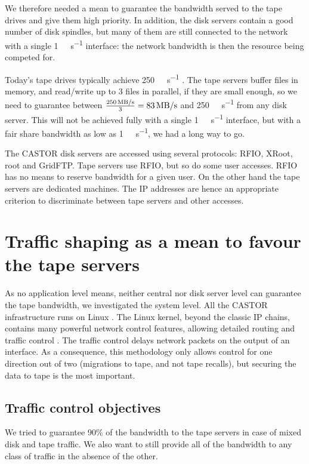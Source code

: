 \documentclass[a4paper]{jpconf}
\begin{document}
We therefore needed a mean to guarantee the bandwidth served to the tape drives and give them high priority. In addition, the disk servers contain a good number of disk spindles, but many of them are still connected to the network with a single \SI[per-mode=symbol]{1}{\giga\bit\per\second} interface: the network bandwidth is then the resource being competed for.

Today's tape drives typically achieve \SI[per-mode=symbol]{250}{\mega\byte\per\second}\cite{IBM} \cite{STK}. The tape servers buffer files in memory, and read/write up to 3 files in parallel, if they are small enough, so we need to guarantee between $\frac{\SI[per-mode=symbol]{250}{\mega\byte\per\second}}{3} = \SI[per-mode=symbol]{83}{\mega\byte\per\second}$ and \SI[per-mode=symbol]{250}{\mega\byte\per\second} from any disk server. This will not be achieved fully with a single \SI[per-mode=symbol]{1}{\giga\bit\per\second} interface, but with a fair share bandwidth as low as \SI[per-mode=symbol]{1}{\mega\byte\per\second}, we had a long way to go.

The CASTOR disk servers are accessed using several protocols: RFIO, XRoot, root and GridFTP. Tape servers use RFIO, but so do some user accesses. RFIO has no means to reserve bandwidth for a given user. On the other hand the tape servers are dedicated machines. The IP addresses are hence an appropriate criterion to discriminate between tape servers and other accesses.

\section{Traffic shaping as a mean to favour the tape servers}

As no application level means, neither central nor disk server level can guarantee the tape bandwidth, we investigated the system level. All the CASTOR infrastructure runs on Linux \cite{SLC}. The Linux kernel, beyond the classic IP chains,  contains many powerful network control features, allowing detailed routing and traffic control \cite{lartc}. The traffic control delays network packets on the output of an interface. As a consequence, this methodology only allows control for one direction out of two (migrations to tape, and not tape recalls), but securing the data to tape is the most important.

\subsection{Traffic control objectives}
We tried to guarantee 90\% of the bandwidth to the tape servers in case of mixed disk and tape traffic. We also want to still provide all of the bandwidth to any class of traffic in the absence of the other.
\end{document}
